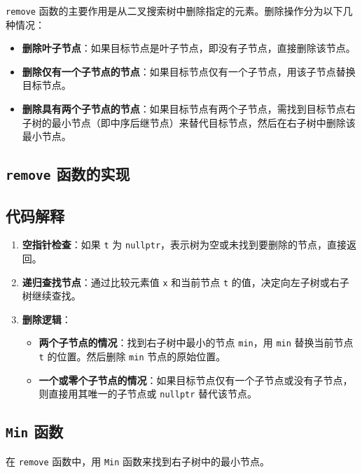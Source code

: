 \documentclass[UTF8]{ctexart}
\begin{document}
\texttt{remove} 函数的主要作用是从二叉搜索树中删除指定的元素。删除操作分为以下几种情况：

\begin{itemize}
    \item \textbf{删除叶子节点}：如果目标节点是叶子节点，即没有子节点，直接删除该节点。
    \item \textbf{删除仅有一个子节点的节点}：如果目标节点仅有一个子节点，用该子节点替换目标节点。
    \item \textbf{删除具有两个子节点的节点}：如果目标节点有两个子节点，需找到目标节点右子树的最小节点（即中序后继节点）来替代目标节点，然后在右子树中删除该最小节点。
\end{itemize}

\subsection{\texttt{remove} 函数的实现}


\subsection{代码解释}

\begin{enumerate}
    \item \textbf{空指针检查}：如果 \texttt{t} 为 \texttt{nullptr}，表示树为空或未找到要删除的节点，直接返回。
    \item \textbf{递归查找节点}：通过比较元素值 \texttt{x} 和当前节点 \texttt{t} 的值，决定向左子树或右子树继续查找。
    \item \textbf{删除逻辑}：
    \begin{itemize}
        \item \textbf{两个子节点的情况}：找到右子树中最小的节点 \texttt{min}，用 \texttt{min} 替换当前节点 \texttt{t} 的位置。然后删除 \texttt{min} 节点的原始位置。
        \item \textbf{一个或零个子节点的情况}：如果目标节点仅有一个子节点或没有子节点，则直接用其唯一的子节点或 \texttt{nullptr} 替代该节点。
    \end{itemize}
\end{enumerate}

\subsection{\texttt{Min} 函数}

在 \texttt{remove} 函数中，用 \texttt{Min} 函数来找到右子树中的最小节点。
\end{document}

